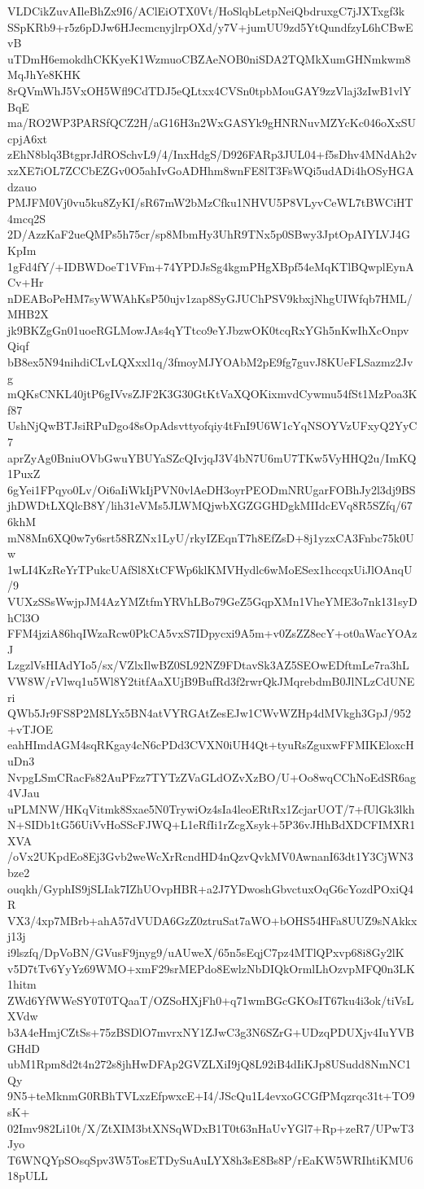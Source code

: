 VLDCikZuvAIleBhZx9I6/AClEiOTX0Vt/HoSlqbLetpNeiQbdruxgC7jJXTxgf3k
SSpKRb9+r5z6pDJw6HJecmcnyjlrpOXd/y7V+jumUU9zd5YtQundfzyL6hCBwEvB
uTDmH6emokdhCKKyeK1WzmuoCBZAeNOB0niSDA2TQMkXumGHNmkwm8MqJhYe8KHK
8rQVmWhJ5VxOH5Wfl9CdTDJ5eQLtxx4CVSn0tpbMouGAY9zzVlaj3zIwB1vlYBqE
ma/RO2WP3PARSfQCZ2H/aG16H3n2WxGASYk9gHNRNuvMZYcKc046oXxSUcpjA6xt
zEhN8blq3BtgprJdROSchvL9/4/InxHdgS/D926FARp3JUL04+f5sDhv4MNdAh2v
xzXE7iOL7ZCCbEZGv0O5ahIvGoADHhm8wnFE8lT3FsWQi5udADi4hOSyHGAdzauo
PMJFM0Vj0vu5ku8ZyKI/sR67mW2bMzCfku1NHVU5P8VLyvCeWL7tBWCiHT4mcq2S
2D/AzzKaF2ueQMPs5h75cr/sp8MbmHy3UhR9TNx5p0SBwy3JptOpAIYLVJ4GKpIm
1gFd4fY/+IDBWDoeT1VFm+74YPDJsSg4kgmPHgXBpf54eMqKTlBQwplEynACv+Hr
nDEABoPeHM7syWWAhKsP50ujv1zap8SyGJUChPSV9kbxjNhgUIWfqb7HML/MHB2X
jk9BKZgGn01uoeRGLMowJAs4qYTtco9eYJbzwOK0tcqRxYGh5nKwIhXcOnpvQiqf
bB8ex5N94nihdiCLvLQXxxl1q/3fmoyMJYOAbM2pE9fg7guvJ8KUeFLSazmz2Jvg
mQKsCNKL40jtP6gIVvsZJF2K3G30GtKtVaXQOKixmvdCywmu54fSt1MzPoa3Kf87
UshNjQwBTJsiRPuDgo48sOpAdsvttyofqiy4tFnI9U6W1cYqNSOYVzUFxyQ2YyC7
aprZyAg0BniuOVbGwuYBUYaSZcQIvjqJ3V4bN7U6mU7TKw5VyHHQ2u/ImKQ1PuxZ
6gYei1FPqyo0Lv/Oi6aIiWkIjPVN0vlAeDH3oyrPEODmNRUgarFOBhJy2l3dj9BS
jhDWDtLXQlcB8Y/lih31eVMs5JLWMQjwbXGZGGHDgkMIIdcEVq8R5SZfq/676khM
mN8Mn6XQ0w7y6srt58RZNx1LyU/rkyIZEqnT7h8EfZsD+8j1yzxCA3Fnbc75k0Uw
1wLI4KzReYrTPukcUAfSl8XtCFWp6klKMVHydlc6wMoESex1hccqxUiJlOAnqU/9
VUXzSSsWwjpJM4AzYMZtfmYRVhLBo79GeZ5GqpXMn1VheYME3o7nk131syDhCl3O
FFM4jziA86hqIWzaRcw0PkCA5vxS7IDpycxi9A5m+v0ZsZZ8ecY+ot0aWacYOAzJ
LzgzlVsHIAdYIo5/sx/VZlxIlwBZ0SL92NZ9FDtavSk3AZ5SEOwEDftmLe7ra3hL
VW8W/rVlwq1u5Wl8Y2titfAaXUjB9BufRd3f2rwrQkJMqrebdmB0JlNLzCdUNEri
QWb5Jr9FS8P2M8LYx5BN4atVYRGAtZesEJw1CWvWZHp4dMVkgh3GpJ/952+vTJOE
eahHImdAGM4sqRKgay4cN6cPDd3CVXN0iUH4Qt+tyuRsZguxwFFMIKEloxcHuDn3
NvpgLSmCRacFs82AuPFzz7TYTzZVaGLdOZvXzBO/U+Oo8wqCChNoEdSR6ag4VJau
uPLMNW/HKqVitmk8Sxae5N0TrywiOz4sIa4leoERtRx1ZcjarUOT/7+fUlGk3lkh
N+SIDb1tG56UiVvHoSScFJWQ+L1eRfIi1rZcgXsyk+5P36vJHhBdXDCFIMXR1XVA
/oVx2UKpdEo8Ej3Gvb2weWcXrRcndHD4nQzvQvkMV0AwnanI63dt1Y3CjWN3bze2
ouqkh/GyphIS9jSLIak7IZhUOvpHBR+a2J7YDwoshGbvctuxOqG6cYozdPOxiQ4R
VX3/4xp7MBrb+ahA57dVUDA6GzZ0ztruSat7aWO+bOHS54HFa8UUZ9sNAkkxj13j
i9lszfq/DpVoBN/GVusF9jnyg9/uAUweX/65n5sEqjC7pz4MTlQPxvp68i8Gy2lK
v5D7tTv6YyYz69WMO+xmF29srMEPdo8EwlzNbDIQkOrmlLhOzvpMFQ0n3LK1hitm
ZWd6YfWWeSY0T0TQaaT/OZSoHXjFh0+q71wmBGcGKOsIT67ku4i3ok/tiVsLXVdw
b3A4eHmjCZtSs+75zBSDlO7mvrxNY1ZJwC3g3N6SZrG+UDzqPDUXjv4IuYVBGHdD
ubM1Rpm8d2t4n272s8jhHwDFAp2GVZLXiI9jQ8L92iB4dIiKJp8USudd8NmNC1Qy
9N5+teMknmG0RBhTVLxzEfpwxcE+I4/JScQu1L4evxoGCGfPMqzrqc31t+TO9sK+
02Imv982Li10t/X/ZtXIM3btXNSqWDxB1T0t63nHaUvYGl7+Rp+zeR7/UPwT3Jyo
T6WNQYpSOsqSpv3W5TosETDySuAuLYX8h3sE8Bs8P/rEaKW5WRIhtiKMU618pULL
